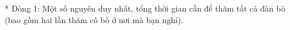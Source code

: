 * Dòng 1: Một số nguyên duy nhất, tổng thời gian cần để thăm tất cả đàn bò (bao gồm hai lần thăm cô bò ở nơi mà bạn nghỉ).  

\